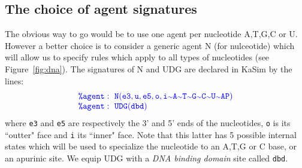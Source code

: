 \documentclass[11pt]{article}
\def\mtt#1{{\tt{\color{blue} #1}}}
\def\int{{\scriptstyle\sim}}
\def\Kadec#1#2{\color{blue}\mtt{\hbox{\color{blue}\tt\%}#1:\ #2}}
\begin{document}
\subsection{The choice of agent signatures} 
The obvious way to go would be to use one agent per nucleotide A,T,G,C or U. However a better choice is to consider a generic agent N (for nulceotide) which will allow us to specify rules which apply to all types of nucleotides (see Figure~\ref{fig:dna}). The signatures of N and UDG are declared in KaSim by the lines:
$$
\begin{array}{l}
\Kadec{agent}{N(e3,u,e5,o,i\int A\int T\int G\int C\int U\int AP)}\\
\Kadec{agent}{UDG(dbd)}
\end{array}
$$
where \texttt{e3} and \texttt{e5} are respectively the 3' and 5' ends of the nucleotides, \texttt{o} is its ``outter" face and \texttt{i} its ``inner" face. Note that this latter has 5 possible internal states which will be used to specialize the nucleotide to an A,T,G or C base, or an apurinic site. We equip UDG with a \emph{DNA binding domain} site called \texttt{dbd}. 
\end{document}
